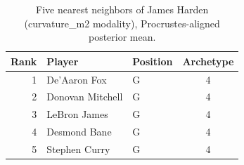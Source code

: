 \begin{table}[htbp]
  \centering\small
  \begin{tabular}{rllc}
    \toprule
    Rank & Player & Position & Archetype \\
    \midrule
    1 & De'Aaron Fox & G & 4 \\
    2 & Donovan Mitchell & G & 4 \\
    3 & LeBron James & G & 4 \\
    4 & Desmond Bane & G & 4 \\
    5 & Stephen Curry & G & 4 \\
    \bottomrule
  \end{tabular}
  \caption{Five nearest neighbors of James Harden (curvature_m2 modality), Procrustes-aligned posterior mean.}
  \label{tab:James_Harden_neighbors_curvature_m2}
\end{table}

